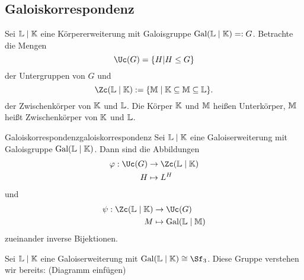 \subsection{Galoiskorrespondenz}
\label{subsec:galoiskorrespondenz}

Sei $\mathbb{L} \mid \mathbb{K}$ eine Körpererweiterung mit Galoisgruppe $\operatorname{\text{Gal}}(\mathbb{L}\mid \mathbb{K}) =: G$. Betrachte die Mengen
\begin{equation}
\Uc(G) = \{H | H \leq G\}
\end{equation}
der Untergruppen von $G$ und
\begin{equation}
\Zc(\L \mid \K) := \{\M \mid \K \sub \M \sub \L\}.
\end{equation}
der Zwischenkörper von $\mathbb{K}$ und $\mathbb{L}$. Die Körper $\mathbb{K}$ und $\mathbb{M}$ heißen Unterkörper, $\mathbb{M}$ heißt Zwischenkörper von $\mathbb{K}$ und $\mathbb{L}$.
\begin{theorem}{Galoiskorrespondenz}{galoiskorrespondenz}
Sei $\mathbb{L} \mid \mathbb{K}$ eine Galoiserweiterung mit Galoisgruppe $\operatorname{\text{Gal}}(\mathbb{L} \mid \mathbb{K})$. Dann sind die Abbildungen
\begin{equation}
\begin{split}
\varphi: \Uc (G) &\to \Zc (\L \mid \K)\\
H &\mapsto L^H
\end{split}
\end{equation}
und
\begin{equation}
\begin{split}
\psi: \Zc (\L \mid \K) &\to \Uc (G)\\
M &\mapsto \Gal(\L \mid \M)
\end{split}
\end{equation}
zueinander inverse Bijektionen.
\end{theorem}
\begin{beispiel}
Sei $\mathbb{L} \mid \mathbb{K}$ eine Galoiserweiterung mit $\Gal(\L \mid \K) \cong \Sf_3$. Diese Gruppe verstehen wir bereits: (Diagramm einfügen)
\end{beispiel}
